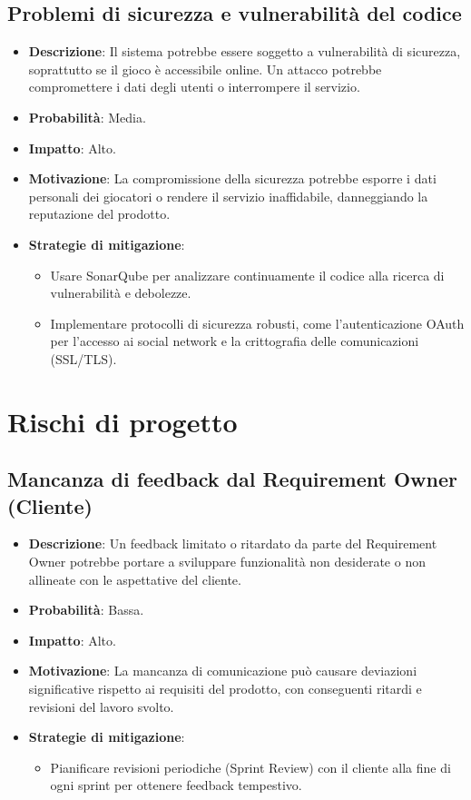 \documentclass[12pt,a4paper]{report}
\begin{document}
\subsection{Problemi di sicurezza e vulnerabilità del codice}
\begin{itemize}
    \item \textbf{Descrizione}: Il sistema potrebbe essere soggetto a vulnerabilità di sicurezza, soprattutto se il gioco è accessibile online. Un attacco potrebbe compromettere i dati degli utenti o interrompere il servizio.
    \item \textbf{Probabilità}: Media.
    \item \textbf{Impatto}: Alto.
    \item \textbf{Motivazione}: La compromissione della sicurezza potrebbe esporre i dati personali dei giocatori o rendere il servizio inaffidabile, danneggiando la reputazione del prodotto.
    \item \textbf{Strategie di mitigazione}:
    \begin{itemize}
        \item Usare SonarQube per analizzare continuamente il codice alla ricerca di vulnerabilità e debolezze.
        \item Implementare protocolli di sicurezza robusti, come l'autenticazione OAuth per l'accesso ai social network e la crittografia delle comunicazioni (SSL/TLS).
    \end{itemize}
\end{itemize}

\section{Rischi di progetto}
\subsection{Mancanza di feedback dal Requirement Owner (Cliente)}
\begin{itemize}
    \item \textbf{Descrizione}: Un feedback limitato o ritardato da parte del Requirement Owner potrebbe portare a sviluppare funzionalità non desiderate o non allineate con le aspettative del cliente.
    \item \textbf{Probabilità}: Bassa.
    \item \textbf{Impatto}: Alto.
    \item \textbf{Motivazione}: La mancanza di comunicazione può causare deviazioni significative rispetto ai requisiti del prodotto, con conseguenti ritardi e revisioni del lavoro svolto.
    \item \textbf{Strategie di mitigazione}:
    \begin{itemize}
        \item Pianificare revisioni periodiche (Sprint Review) con il cliente alla fine di ogni sprint per ottenere feedback tempestivo.
    \end{itemize}
\end{itemize}
\end{document}
